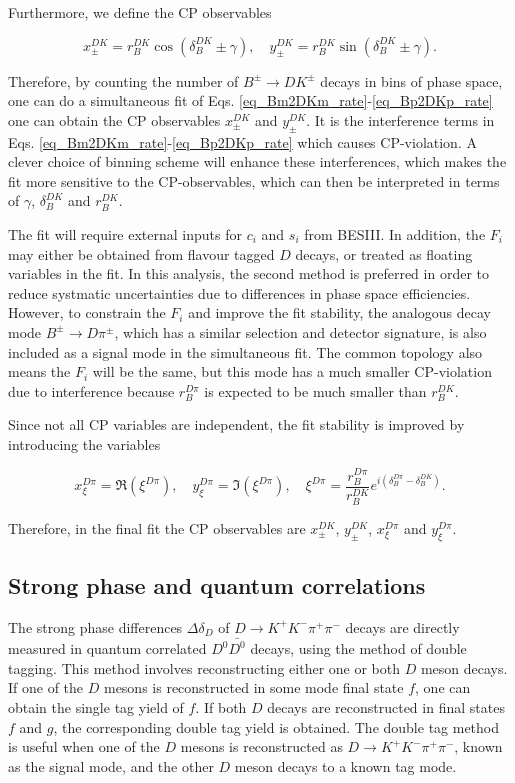 \documentclass[12pt, a4paper, notitlepage, onecolumn]{article}
\numberwithin{equation}{section}
\begin{document}
Furthermore, we define the CP observables

\begin{equation}
  x_\pm^{DK} = r_B^{DK}\cos(\delta_B^{DK}\pm\gamma), \quad  y_\pm^{DK} = r_B^{DK}\sin(\delta_B^{DK}\pm\gamma).
  \label{eq_xy_cp}
\end{equation}

Therefore, by counting the number of $B^\pm\to DK^\pm$ decays in bins of phase space, one can do a simultaneous fit of Eqs. \eqref{eq_Bm2DKm_rate}-\eqref{eq_Bp2DKp_rate} one can obtain the CP observables $x_\pm^{DK}$ and $y_\pm^{DK}$. It is the interference terms in Eqs. \eqref{eq_Bm2DKm_rate}-\eqref{eq_Bp2DKp_rate} which causes CP-violation. A clever choice of binning scheme will enhance these interferences, which makes the fit more sensitive to the CP-observables, which can then be interpreted in terms of $\gamma$, $\delta_B^{DK}$ and $r_B^{DK}$.

The fit will require external inputs for $c_i$ and $s_i$ from BESIII. In addition, the $F_i$ may either be obtained from flavour tagged $D$ decays, or treated as floating variables in the fit. In this analysis, the second method is preferred in order to reduce systmatic uncertainties due to differences in phase space efficiencies. However, to constrain the $F_i$ and improve the fit stability, the analogous decay mode $B^\pm\to D\pi^\pm$, which has a similar selection and detector signature, is also included as a signal mode in the simultaneous fit. The common topology also means the $F_i$ will be the same, but this mode has a much smaller CP-violation due to interference because $r_B^{D\pi}$ is expected to be much smaller than $r_B^{DK}$.

Since not all CP variables are independent, the fit stability is improved by introducing the variables

\begin{equation}
  x_\xi^{D\pi} = \Re(\xi^{D\pi}), \quad y_\xi^{D\pi} = \Im(\xi^{D\pi}), \quad \xi^{D\pi} = \frac{r_B^{D\pi}}{r_B^{DK}}e^{i(\delta_B^{D\pi} - \delta_B^{DK})}.
\end{equation}

Therefore, in the final fit the CP observables are $x_\pm^{DK}$, $y_\pm^{DK}$, $x_\xi^{D\pi}$ and $y_\xi^{D\pi}$.

\subsection{Strong phase and quantum correlations}
The strong phase differences $\Delta\delta_D$ of $D\to K^+K^-\pi^+\pi^-$ decays are directly measured in quantum correlated $D^0\bar{D^0}$ decays, using the method of double tagging. This method involves reconstructing either one or both $D$ meson decays. If one of the $D$ mesons is reconstructed in some mode final state $f$, one can obtain the single tag yield of $f$. If both $D$ decays are reconstructed in final states $f$ and $g$, the corresponding double tag yield is obtained. The double tag method is useful when one of the $D$ mesons is reconstructed as $D\to K^+K^-\pi^+\pi^-$, known as the signal mode, and the other $D$ meson decays to a known tag mode.
\end{document}

